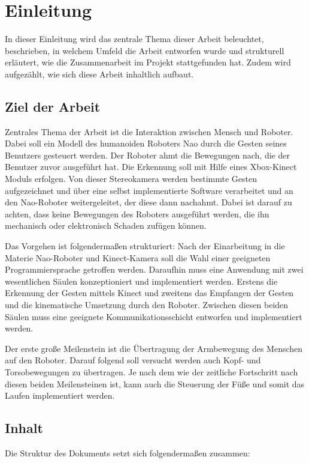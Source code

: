 \chapter{Einleitung}      %
\label{Einleitung}

In dieser Einleitung wird das zentrale Thema dieser Arbeit beleuchtet, beschrieben, in welchem Umfeld die Arbeit entworfen wurde und strukturell erläutert, wie die Zusammenarbeit im Projekt stattgefunden hat. Zudem wird aufgezählt, wie sich diese Arbeit inhaltlich aufbaut.

\section{Ziel der Arbeit}
Zentrales Thema der Arbeit ist die Interaktion zwischen Mensch und Roboter. Dabei soll ein Modell des humanoiden Roboters Nao durch die Gesten seines Benutzers gesteuert werden. Der Roboter ahmt die Bewegungen nach, die der Benutzer zuvor ausgeführt hat. %
Die Erkennung soll mit Hilfe eines Xbox-Kinect Moduls erfolgen. Von dieser Stereokamera werden bestimmte Gesten aufgezeichnet und über eine selbst implementierte Software verarbeitet und an den Nao-Roboter weitergeleitet, der diese dann nachahmt. Dabei ist darauf zu achten, dass keine Bewegungen des Roboters ausgeführt werden, die ihn mechanisch oder elektronisch Schaden zufügen können.

Das Vorgehen ist folgendermaßen strukturiert: Nach der Einarbeitung in die Materie Nao-Roboter und Kinect-Kamera soll die Wahl einer geeigneten Programmiersprache getroffen werden. Daraufhin muss eine  Anwendung mit zwei wesentlichen Säulen konzeptioniert und implementiert werden. Erstens die Erkennung der Gesten mittels Kinect und zweitens das Empfangen der Gesten und die kinematische Umsetzung durch den Roboter. Zwischen diesen beiden Säulen muss eine geeignete Kommunikationsschicht entworfen und implementiert werden.

Der erste große Meilenstein ist die Übertragung der Armbewegung des Menschen auf den Roboter. Darauf folgend soll versucht werden auch Kopf- und Torsobewegungen zu übertragen. Je nach dem wie der zeitliche Fortschritt nach diesen beiden Meilensteinen ist, kann auch die Steuerung der Füße und somit das Laufen implementiert werden.


\section{Inhalt}
Die Struktur des Dokuments setzt sich folgendermaßen zusammen: 

